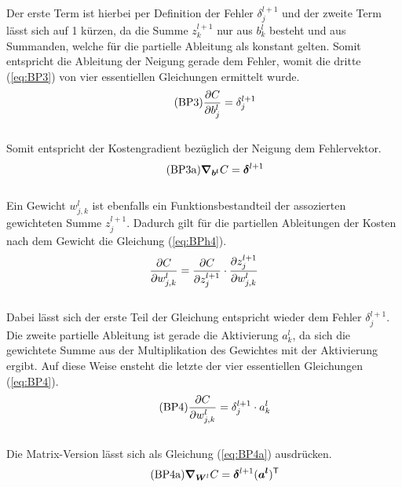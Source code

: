 \begin{appendices}
\begin{equation}
\end{equation}
\\
Der erste Term ist hierbei per Definition der Fehler $\delta_j^{l+1}$ und der
zweite Term lässt sich auf 1 kürzen, da die Summe $z_k^{l+1}$ nur aus
$b_k^l$ besteht und aus Summanden, welche für die partielle Ableitung als konstant gelten.
Somit entspricht die Ableitung der Neigung gerade dem Fehler, womit die
dritte (\ref{eq:BP3}) von vier essentiellen Gleichungen ermittelt wurde.
\\
\begin{equation}\tag{BP3}\label{eq:BP3}
  \frac{\partial C}{\partial b_j^l} = \delta_j^{l+1}
\end{equation}
\\
Somit entspricht der Kostengradient bezüglich der Neigung dem Fehlervektor.
\\
\begin{equation}\tag{BP3a}\label{eq:BP3a}
  \bm{\nabla}_{\bm{b^l}} C =  \bm{\delta}^{l+1}
\end{equation}
\\
Ein Gewicht $w_{j,k}^l$ ist ebenfalls ein Funktionsbestandteil der assozierten
gewichteten Summe $z_j^{l+1}$. Dadurch gilt für die partiellen Ableitungen der
Kosten nach dem Gewicht die Gleichung (\ref{eq:BPh4}).
\\
\begin{equation}\label{eq:BPh4}
  \frac{\partial C}{\partial w_{j,k}^l} = \frac{\partial C}{\partial z_j^{l+1}} \cdot \frac{\partial z_j^{l+1}}{\partial w_{j,k}^l}
\end{equation}
\\
Dabei lässt sich der erste Teil der Gleichung entspricht wieder dem Fehler $\delta_j^{l+1}$.
Die zweite partielle Ableitung ist gerade die Aktivierung $a_k^l$, da sich die
gewichtete Summe aus der Multiplikation des Gewichtes mit der Aktivierung ergibt.
Auf diese Weise ensteht die letzte der vier essentiellen Gleichungen (\ref{eq:BP4}).
\begin{equation}\tag{BP4}\label{eq:BP4}
  \frac{\partial C}{\partial w_{j,k}^l} = \delta_j^{l+1} \cdot a_k^l
\end{equation}
\\
Die Matrix-Version lässt sich als Gleichung (\ref{eq:BP4a}) ausdrücken.
\begin{equation}\tag{BP4a}\label{eq:BP4a}
  \bm{\nabla}_{\bm{W}^l} C = \bm{\delta}^{l+1} (\bm{a^l})^{\mathsf{T}}
\end{equation}


\end{appendices}
